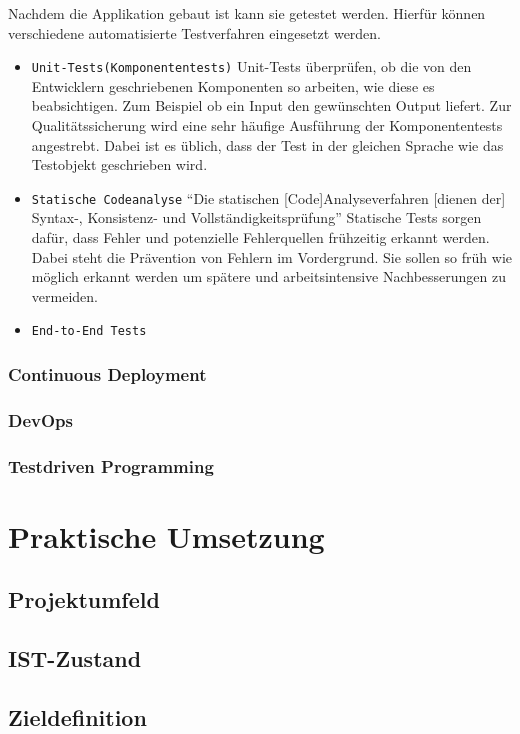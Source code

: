 Nachdem die Applikation gebaut ist kann sie getestet werden. Hierfür können verschiedene automatisierte Testverfahren eingesetzt werden.
\begin{itemize}
	\item \texttt{Unit-Tests(Komponententests)} Unit-Tests überprüfen, ob die von den Entwicklern geschriebenen Komponenten so arbeiten, wie diese es beabsichtigen. Zum Beispiel ob ein Input den gewünschten Output liefert.\autocite[Vgl.][S.21]{Westphal.2012} Zur Qualitätssicherung wird eine sehr häufige Ausführung der Komponententests angestrebt. Dabei ist es üblich, dass der Test in der gleichen Sprache wie das Testobjekt geschrieben wird.
	\item  \texttt{Statische Codeanalyse} \enquote{Die statischen [Code]Analyseverfahren [dienen der] Syntax-, Konsistenz- und Vollständigkeitsprüfung}\autocite[S.264]{Bommer.2008} Statische Tests sorgen dafür, dass Fehler und potenzielle Fehlerquellen frühzeitig erkannt werden. Dabei steht die Prävention von Fehlern im Vordergrund. Sie sollen so früh wie möglich erkannt werden um spätere und arbeitsintensive Nachbesserungen zu vermeiden.\autocite[Vgl.][S.263]{Bommer.2008}
	\item  \texttt{End-to-End Tests}
\end{itemize}
\subsection{Continuous Deployment}
\subsection{DevOps}
\subsection{Testdriven Programming}  
\chapter{Praktische Umsetzung}
\section{Projektumfeld}
\section{IST-Zustand}
\section{Zieldefinition}
